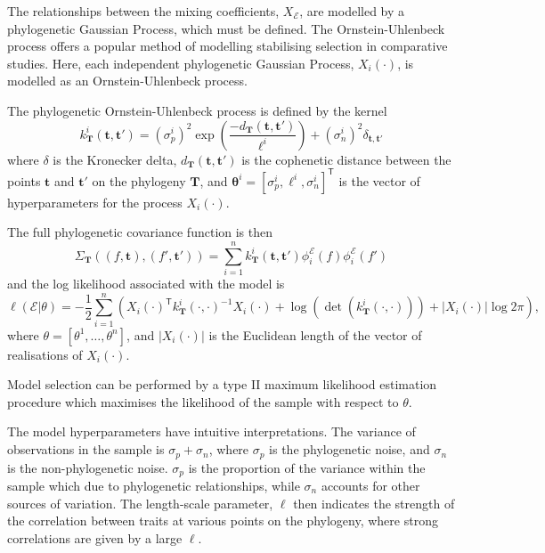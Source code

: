 \documentclass[wsdraft]{ws-rv9x6} %
\begin{document}
The relationships between the mixing coefficients, \(X_{\mathcal{E}}\), are modelled by a phylogenetic Gaussian Process, which must be defined. The Ornstein-Uhlenbeck process offers a popular method of modelling stabilising selection in comparative studies.\cite{hansen1997stabilizing} \cite{collen2012evolution} \cite{hadjipantelis2013function} Here, each independent phylogenetic Gaussian Process, \(X_i(\cdot)\), is modelled as an Ornstein-Uhlenbeck process.

The phylogenetic Ornstein-Uhlenbeck process is defined by the kernel
\[
k_{\mathbf{T}}^i(\mathbf{t}, \mathbf{t}') = (\sigma_p^i)^2 \exp \left( \frac{-d_{\mathbf{T}}(\mathbf{t}, \mathbf{t}')}{\ell^i} \right) + (\sigma_n^i)^2 \delta_{\mathbf{t}, \mathbf{t}'}
\] 
where \(\delta\) is the Kronecker delta, \(d_{\mathbf{T}}(\mathbf{t}, \mathbf{t}')\) is the cophenetic distance between the points \(\mathbf{t}\) and \(\mathbf{t}'\) on the phylogeny \(\mathbf{T}\), and \(\mathbf{\theta}^i = [\sigma_p^i, \ell^i, \sigma_n^i]^{\mathsf{T}}\) is the vector of hyperparameters for the process \(X_i(\cdot)\).

The full phylogenetic covariance function is then
\[
\Sigma_{\mathbf{T}}((f, \mathbf{t}), (f', \mathbf{t}')) = \sum_{i = 1}^{n}  k_{\mathbf{T}}^i(\mathbf{t}, \mathbf{t}') \phi_i^{\mathcal{E}}(f) \phi_i^{\mathcal{E}}(f')
\]
and the log likelihood associated with the model is
\[
\ell(\mathcal{E} | \theta) = -\frac{1}{2} \sum_{i = 1}^{n} \left( X_i(\cdot)^{\mathsf{T}} k_{\mathbf{T}}^i(\cdot, \cdot)^{-1}  X_i(\cdot) + \log( \det (k_{\mathbf{T}}^i(\cdot, \cdot))) + |X_i(\cdot)| \log 2\pi   \right),
\]
where \(\theta = [\theta^1, \dots , \theta^n]\), and \(|X_i(\cdot)|\) is the Euclidean length of the vector of realisations of \(X_i(\cdot)\). 

Model selection can be performed by a type II maximum likelihood estimation procedure which maximises the likelihood of the sample with respect to \(\theta\).

The model hyperparameters have intuitive interpretations. The variance of observations in the sample is \(\sigma_p + \sigma_n\), where \(\sigma_p\) is the phylogenetic noise, and \(\sigma_n\) is the non-phylogenetic noise. \(\sigma_p\) is the proportion of the variance within the sample which due to phylogenetic relationships, while \(\sigma_n\) accounts for other sources of variation. The length-scale parameter, \(\ell\) then indicates the strength of the correlation between traits at various points on the phylogeny, where strong correlations are given by a large \(\ell\).
\end{document}
